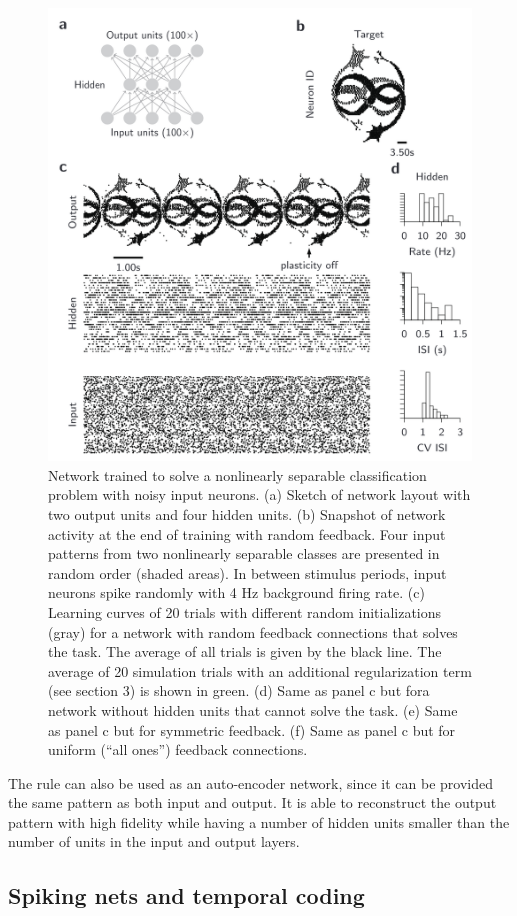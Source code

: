 \documentclass[main]{subfiles}
\begin{document}
%
\begin{figure}[H]
    \centering
    \includegraphics[width=0.8\linewidth]{10_DeepLearningWithSpikes/figures/spatio.PNG}
    \caption{Network trained to solve a nonlinearly separable classification problem with noisy input neurons. (a) Sketch of network layout with two output units and four hidden units. (b) Snapshot of network activity at the end of training with random feedback. Four input patterns from two nonlinearly separable classes are presented in random order (shaded areas). In between stimulus periods, input neurons spike randomly with 4 Hz background firing rate. (c) Learning curves of 20 trials with different random initializations (gray) for a network with random feedback connections that solves the task. The average of all trials is given by the black line. The average of 20 simulation trials with an additional regularization term (see section 3) is shown in green. (d) Same as panel c but fora network without hidden units that cannot solve the task. (e) Same as panel c but for symmetric feedback. (f) Same as panel c but for uniform (“all ones”) feedback connections.}
    \label{fig:my_label}
\end{figure}
%

The rule can also be used as an auto-encoder network, since it can be provided the same pattern as both input and output. It is able to reconstruct the output pattern with high fidelity while having a number of hidden units smaller than the number of units in the input and output layers.
\subsection{Spiking nets and temporal coding}
\end{document}
